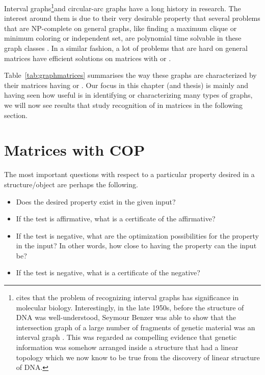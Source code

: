 Interval graphs\footnote{\cite{mcc04} cites that the problem of
  recognizing interval graphs has significance in molecular
  biology. Interestingly, in the late 1950s, before the structure of
  DNA was well-understood, Seymour Benzer was able to show that the
  intersection graph of a large number of fragments of genetic
  material was an interval graph \cite{sb59}. This was regarded as
  compelling evidence that genetic information was somehow arranged
  inside a structure that had a linear topology which we now know to
  be true from the discovery of linear structure of DNA.}and
circular-arc graphs have a long history in research.  The interest
around them is due to their very desirable property that several
problems that are NP-complete on general graphs, like finding a
maximum clique or minimum coloring or independent set, are polynomial
time solvable in these graph classes \cite{clrs01}.  In a similar
fashion, a lot of problems that are hard on general matrices have
efficient solutions on matrices with \COP or \CROP \cite[more
citations pg.\,33]{d08phd}.

Table~\ref{tab:graphmatrices} summarises the way these graphs are
characterized by their matrices having \COP or \CROP.
Our focus in this chapter (and thesis) is mainly \COP and 
having seen how useful \COP is in identifying or characterizing many
types of graphs, we will now see results that study recognition of \COP
in matrices in the following section.

\tabgraphmatrices  

\section{Matrices with COP}
\label{sec:surveycoptest}

The most important questions with respect to a particular 
property desired in a structure/object are perhaps the following.
\begin{itemize}%
\singlespacing
\item Does the desired property exist in the given input?
\item If the test is affirmative, what is a certificate of the affirmative?
\item If the test is negative, what are the optimization possibilities
  for the property in the input? In other words, how close to having the
  property can the input be?
\item If the test is negative, what is a certificate of the negative?
\end{itemize}

